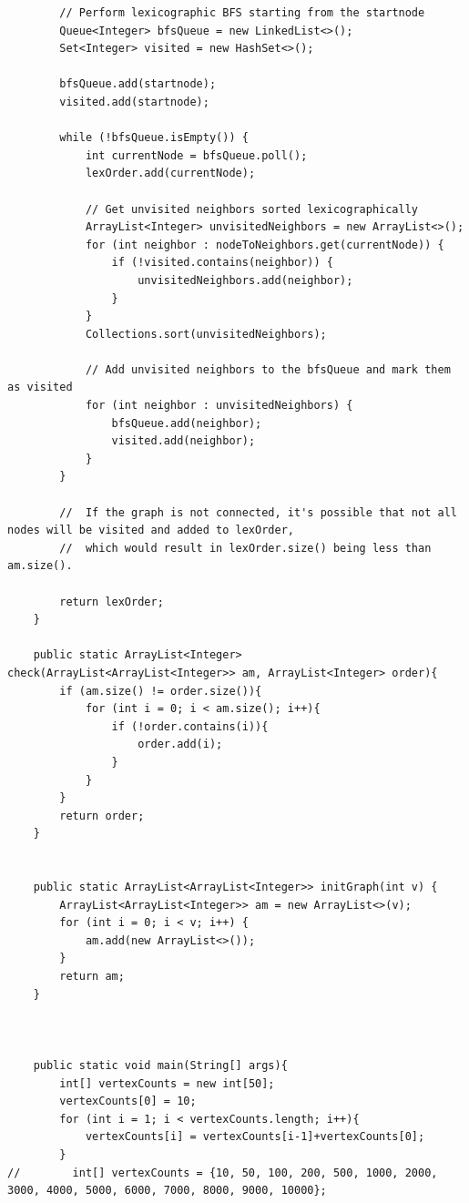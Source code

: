 \documentclass{article}
\begin{document}
\begin{verbatim}
        // Perform lexicographic BFS starting from the startnode
        Queue<Integer> bfsQueue = new LinkedList<>();
        Set<Integer> visited = new HashSet<>();

        bfsQueue.add(startnode);
        visited.add(startnode);

        while (!bfsQueue.isEmpty()) {
            int currentNode = bfsQueue.poll();
            lexOrder.add(currentNode);

            // Get unvisited neighbors sorted lexicographically
            ArrayList<Integer> unvisitedNeighbors = new ArrayList<>();
            for (int neighbor : nodeToNeighbors.get(currentNode)) {
                if (!visited.contains(neighbor)) {
                    unvisitedNeighbors.add(neighbor);
                }
            }
            Collections.sort(unvisitedNeighbors);

            // Add unvisited neighbors to the bfsQueue and mark them as visited
            for (int neighbor : unvisitedNeighbors) {
                bfsQueue.add(neighbor);
                visited.add(neighbor);
            }
        }

        //  If the graph is not connected, it's possible that not all nodes will be visited and added to lexOrder,
        //  which would result in lexOrder.size() being less than am.size().

        return lexOrder;
    }

    public static ArrayList<Integer> check(ArrayList<ArrayList<Integer>> am, ArrayList<Integer> order){
        if (am.size() != order.size()){
            for (int i = 0; i < am.size(); i++){
                if (!order.contains(i)){
                    order.add(i);
                }
            }
        }
        return order;
    }


    public static ArrayList<ArrayList<Integer>> initGraph(int v) {
        ArrayList<ArrayList<Integer>> am = new ArrayList<>(v);
        for (int i = 0; i < v; i++) {
            am.add(new ArrayList<>());
        }
        return am;
    }



    public static void main(String[] args){
        int[] vertexCounts = new int[50];
        vertexCounts[0] = 10;
        for (int i = 1; i < vertexCounts.length; i++){
            vertexCounts[i] = vertexCounts[i-1]+vertexCounts[0];
        }
//        int[] vertexCounts = {10, 50, 100, 200, 500, 1000, 2000, 3000, 4000, 5000, 6000, 7000, 8000, 9000, 10000};


\end{verbatim}
\end{document}
